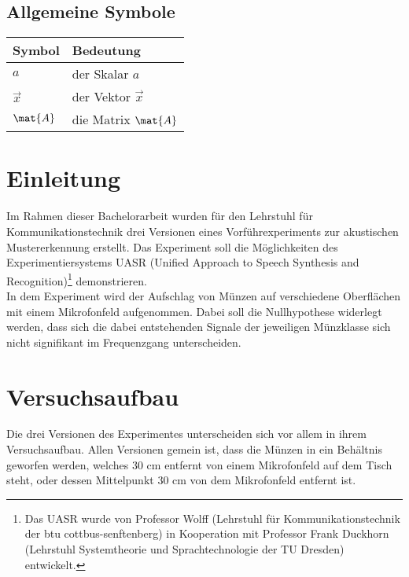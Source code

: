 \tableofcontents %
\listoffigures %
\listoftables %

\label{s.sym} %
\section*{Allgemeine Symbole}\label{s.sym.alg}
\begin{flushleft}\begin{tabularx}{\textwidth}{l|X}
Symbol & Bedeutung\\\hline
$a$ & der Skalar $a$ \\
$\vec{x}$ & der Vektor $\vec{x}$\\
$\mat{A}$ & die Matrix $\mat{A}$\\
\end{tabularx}\end{flushleft}




\chapter{Einleitung}

Im Rahmen dieser Bachelorarbeit wurden für den Lehrstuhl für Kommunikationstechnik drei Versionen eines Vorführexperiments zur akustischen Mustererkennung erstellt. Das Experiment soll die Möglichkeiten des Experimentiersystems UASR (Unified Approach to Speech Synthesis and Recognition)\footnote{Das UASR wurde von Professor Wolff (Lehrstuhl für Kommunikationstechnik der btu cottbus-senftenberg) in Kooperation mit Professor Frank Duckhorn (Lehrstuhl Systemtheorie und Sprachtechnologie der TU Dresden) entwickelt.} demonstrieren. \\
In dem Experiment wird der Aufschlag von Münzen auf verschiedene Oberflächen mit einem Mikrofonfeld aufgenommen. Dabei soll die Nullhypothese widerlegt werden, dass sich die dabei entstehenden Signale der jeweiligen Münzklasse sich nicht signifikant im Frequenzgang unterscheiden.


\chapter{Versuchsaufbau}

Die drei Versionen des Experimentes unterscheiden sich vor allem in ihrem Versuchsaufbau.
Allen Versionen gemein ist, dass die Münzen in ein Behältnis geworfen werden, welches 30 cm entfernt von einem Mikrofonfeld auf dem Tisch steht, oder dessen Mittelpunkt 30 cm von dem Mikrofonfeld entfernt ist. 

